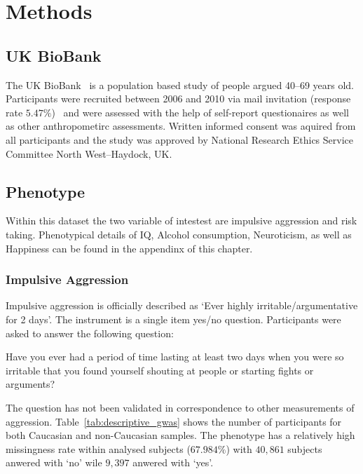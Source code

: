 \section{Methods}
\label{sec:methods}

\subsection{UK BioBank}
\label{sub:uk_biobank}
The UK BioBank~\cite{Allen2014} is a population based study of people argued 40--69 years old. 
Participants were recruited between 2006 and 2010 via mail invitation (response rate $5.47\%$)~\cite{Sudlow2015} and were assessed with the help of self-report questionaires as well as other anthropometirc assessments.
Written informed consent was aquired from all participants and the study was approved by National Research Ethics Service Committee North West–Haydock, UK\@.

\subsection{Phenotype}
\label{sub:phenotype}

Within this dataset the two variable of intestest are impulsive aggression and risk taking.
Phenotypical details of IQ, Alcohol consumption, Neuroticism, as well as Happiness can be found in the appendinx of this chapter. 

\subsubsection{Impulsive Aggression}
\label{ssub:impulsive_aggression}
Impulsive aggression is officially described as `Ever highly irritable/argumentative for 2 days'.
The instrument is a single item yes/no question. 
Participants were asked to answer the following question:
\begin{displayquote}
  Have you ever had a period of time lasting at least two days when you were so irritable that you found yourself shouting at people or starting fights or arguments?
\end{displayquote}
The question has not been validated in correspondence to other measurements of aggression.
Table~\ref{tab:descriptive_gwas} shows the number of participants for both Caucasian and non-Caucasian samples.
The phenotype has a relatively high missingness rate within analysed subjects ($67.984\%$) with $40,861$ subjects anwered with `no' wile $9,397$ anwered with `yes'.

